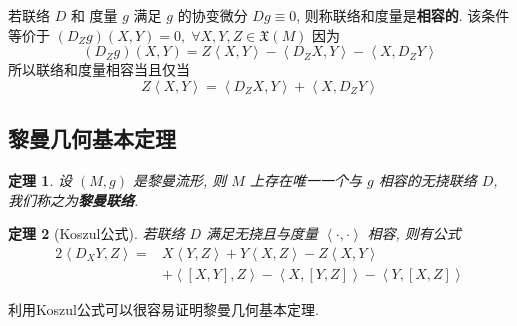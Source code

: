 \documentclass{book}
\newtheorem{theorem}{\indent 定理}[section]
\begin{document}
        若联络 $D$ 和 度量 $g$ 满足 $g$ 的协变微分 $Dg\equiv0$, 则称联络和度量是\textbf{相容的}. 该条件等价于 $(D_Zg)(X,Y)=0,\;\forall X,Y,Z\in\mathfrak{X}(M)$ 因为
        \begin{equation*}
            (D_Zg)(X,Y) = Z\left\langle X,Y\right\rangle - \left\langle D_ZX,Y\right\rangle - \left\langle X,D_ZY\right\rangle
        \end{equation*}
        所以联络和度量相容当且仅当
        \begin{equation*}
            Z\left\langle X,Y\right\rangle = \left\langle D_ZX,Y\right\rangle + \left\langle X,D_ZY\right\rangle
        \end{equation*}

    \subsection{黎曼几何基本定理}
        \begin{theorem}
            设 $(M,g)$ 是黎曼流形, 则 $M$ 上存在唯一一个与 $g$ 相容的无挠联络 $D$, 我们称之为\textbf{黎曼联络}.
        \end{theorem}

        \begin{theorem}[Koszul公式]
            若联络 $D$ 满足无挠且与度量 $\left\langle \cdot,\cdot\right\rangle$ 相容, 则有公式
            \begin{align} \label{eq:koszul}
                2\left\langle D_XY,Z\right\rangle =& X\left\langle Y,Z\right\rangle+ Y\left\langle X,Z\right\rangle -Z\left\langle X,Y\right\rangle \nonumber \\
                & +\left\langle [X,Y],Z\right\rangle -\left\langle X,[Y,Z]\right\rangle -\left\langle Y,[X,Z]\right\rangle
            \end{align}
        \end{theorem}
        利用Koszul公式可以很容易证明黎曼几何基本定理.
\end{document}
